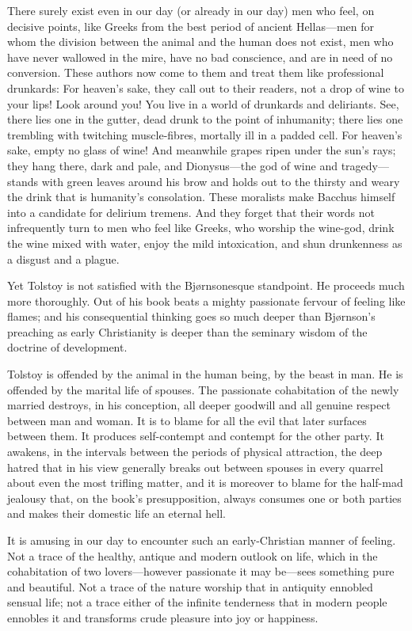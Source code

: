 \documentclass[12pt,a4paper]{article}
\begin{document}
There surely exist even in our day (or already in our day) men who
feel, on decisive points, like Greeks from the best period of ancient
Hellas---men for whom the division between the animal and the human
does not exist, men who have never wallowed in the mire, have no bad
conscience, and are in need of no conversion. These authors now come
to them and treat them like professional drunkards: For heaven's sake,
they call out to their readers, not a drop of wine to your lips! Look
around you! You live in a world of drunkards and deliriants. See,
there lies one in the gutter, dead drunk to the point of inhumanity;
there lies one trembling with twitching muscle-fibres, mortally ill in
a padded cell. For heaven's sake, empty no glass of wine! And
meanwhile grapes ripen under the sun's rays; they hang there, dark
and pale, and Dionysus---the god of wine and tragedy---stands with
green leaves around his brow and holds out to the thirsty and weary
the drink that is humanity's consolation. These moralists make Bacchus
himself into a candidate for delirium tremens. And they forget that
their words not infrequently turn to men who feel like Greeks, who
worship the wine-god, drink the wine mixed with water, enjoy the mild
intoxication, and shun drunkenness as a disgust and a plague.

Yet Tolstoy is not satisfied with the Bjørnsonesque standpoint. He
proceeds much more thoroughly. Out of his book beats a mighty
passionate fervour of feeling like flames; and his consequential
thinking goes so much deeper than Bjørnson's preaching as early
Christianity is deeper than the seminary wisdom of the doctrine of
development.

Tolstoy is offended by the animal in the human being, by the beast in
man. He is offended by the marital life of spouses. The passionate
cohabitation of the newly married destroys, in his conception, all
deeper goodwill and all genuine respect between man and woman. It is
to blame for all the evil that later surfaces between them. It produces
self-contempt and contempt for the other party. It awakens, in the
intervals between the periods of physical attraction, the deep hatred
that in his view generally breaks out between spouses in every quarrel
about even the most trifling matter, and it is moreover to blame for
the half-mad jealousy that, on the book's presupposition, always
consumes one or both parties and makes their domestic life an eternal
hell.

It is amusing in our day to encounter such an early-Christian manner
of feeling. Not a trace of the healthy, antique and modern outlook on
life, which in the cohabitation of two lovers---however passionate it
may be---sees something pure and beautiful. Not a trace of the nature
worship that in antiquity ennobled sensual life; not a trace either
of the infinite tenderness that in modern people ennobles it and
transforms crude pleasure into joy or happiness.
\end{document}
